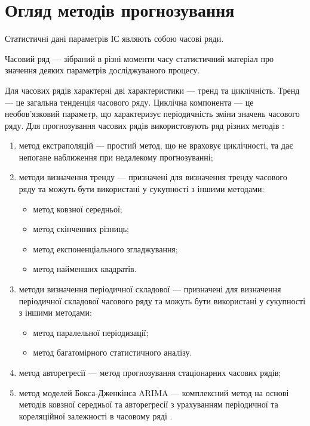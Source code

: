 \documentclass{thesis_utf8}
\begin{document}
\section{Огляд методів прогнозування}
Статистичні дані параметрів ІС являють собою часові ряди.

Часовий ряд --- зібраний в різні моменти часу статистичний матеріал про значення деяких параметрів досліджуваного процесу.

Для часових рядів характерні дві характеристики --- тренд та циклічність. Тренд --- це загальна тенденція  часового ряду. Циклічна компонента --- це необов'язковий параметр, що характеризує періодичність зміни значень часового ряду. Для прогнозування часових рядів використовують ряд різних методів \cite{vensel,	afanas}:
\begin{enumerate}
    \item метод екстраполяцій --- простий метод, що не враховує циклічності, та дає непогане наближення при недалекому прогнозуванні;
    \item методи визначення тренду --- призначені для визначення тренду часового ряду та можуть бути використані у сукупності з іншими методами:
        \begin{itemize}
            \item метод ковзної середньої;
            \item метод скінченних різниць;
            \item метод експоненціального згладжування;
            \item метод найменших квадратів.
        \end{itemize}
    \item методи визначення періодичної складової --- призначені для визначення періодичної складової часового ряду та можуть бути використані у сукупності з іншими методами:
        \begin{itemize}
            \item метод паралельної періодизації;
            \item метод багатомірного статистичного аналізу.
        \end{itemize}
    \item метод авторегресії --- метод прогнозування стаціонарних часових рядів;
    \item метод моделей Бокса-Дженкінса ARIMA --- комплексний метод на основі методів ковзної середньої та авторегресії з урахуванням періодичної та кореляційної залежності в часовому ряді \cite{gep}.
\end{enumerate}
\end{document}
